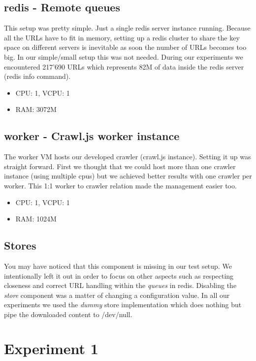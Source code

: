 \subsection{redis - Remote queues}
This setup was pretty simple. Just a single redis server instance running. Because all the URLs have to fit in memory, setting up a redis cluster to share the key space on different servers is inevitable as soon the number of URLs becomes too big. In our simple/small setup this was not needed. During our experiments we encountered 217'690 URLs which represents 82M of data inside the redis server (redis info command).

\begin{itemize}
  \item CPU: 1, VCPU: 1
  \item RAM: 3072M
\end{itemize}

\subsection{worker - Crawl.js worker instance}
The worker VM hosts our developed crawler (crawl.js instance). Setting it up was straight forward. First we thought that we could host more than one crawler instance (using multiple cpus) but we achieved better results with one crawler per worker. This 1:1 worker to crawler relation made the management easier too.

\begin{itemize}
  \item CPU: 1, VCPU: 1
  \item RAM: 1024M
\end{itemize}

\subsection{Stores}
You may have noticed that this component is missing in our test setup. We intentionally left it out in order to focus on other aspects such as respecting closeness and correct URL handling within the \emph{queues} in redis. Disabling the \emph{store} component was a matter of changing a configuration value. In all our experiments we used the \emph{dummy} store implementation which does nothing but pipe the downloaded content to /dev/null.

\section{Experiment 1}

